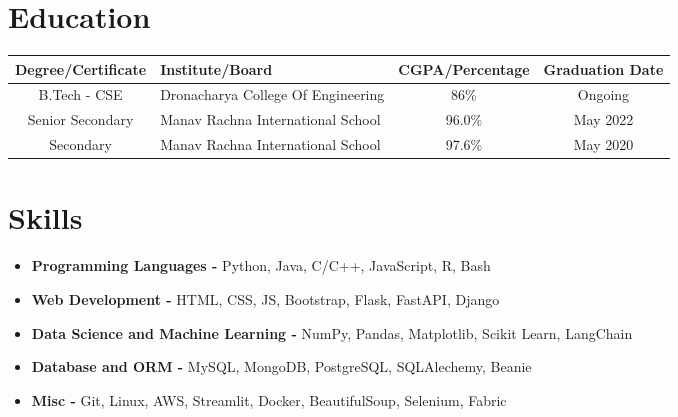 \documentclass[a4paper,11pt]{article}
\begin{document}
\section{Education}
\vspace{-2mm}
    \setlength{\tabcolsep}{2pt} %
    \small\begin{tabularx}{\textwidth}{|c|Y|c|c|}
      \hline
      \textbf{Degree/Certificate} & \textbf{Institute/Board} & \textbf{CGPA/Percentage} & \textbf{Graduation Date}\\
      \hline
      B.Tech - CSE & Dronacharya College Of Engineering & 86\% & Ongoing\\
      \hline
      Senior Secondary & Manav Rachna International School & 96.0\% & May 2022 \\
      \hline
      Secondary & Manav Rachna International School & 97.6\% & May 2020 \\
      \hline
    \end{tabularx}
\vspace{-5mm}

\section*{Skills}
\vspace{-2mm}
\begin{itemize}[label=\textbullet, left=0pt]
    \item \textbf{Programming Languages -} \small Python, Java, C/C++, JavaScript, R, Bash
    \vspace{-2mm}
    \item \textbf{Web Development -} \small HTML, CSS, JS, Bootstrap, Flask, FastAPI, Django
    \vspace{-2mm}
    \item \textbf{Data Science and Machine Learning -} \small NumPy, Pandas, Matplotlib, Scikit Learn, LangChain
    \vspace{-2mm}
    \item \textbf{Database and ORM -} \small MySQL, MongoDB, PostgreSQL, SQLAlechemy, Beanie
    \vspace{-2mm}
    \item \textbf{Misc -} \small Git, Linux, AWS, Streamlit, Docker, BeautifulSoup, Selenium, Fabric
    \vspace{-2mm}
\end{itemize}
\vspace{-5mm}
\end{document}
